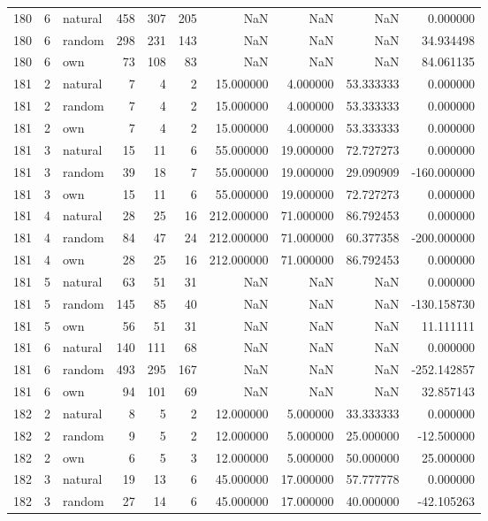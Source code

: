 \begin{table}[htbp]
\begin{tabular}{rrlrrrrrrr}
180 & 6 & natural & 458 & 307 & 205 & NaN & NaN & NaN & 0.000000 \\
180 & 6 & random & 298 & 231 & 143 & NaN & NaN & NaN & 34.934498 \\
180 & 6 & own & 73 & 108 & 83 & NaN & NaN & NaN & 84.061135 \\
181 & 2 & natural & 7 & 4 & 2 & 15.000000 & 4.000000 & 53.333333 & 0.000000 \\
181 & 2 & random & 7 & 4 & 2 & 15.000000 & 4.000000 & 53.333333 & 0.000000 \\
181 & 2 & own & 7 & 4 & 2 & 15.000000 & 4.000000 & 53.333333 & 0.000000 \\
181 & 3 & natural & 15 & 11 & 6 & 55.000000 & 19.000000 & 72.727273 & 0.000000 \\
181 & 3 & random & 39 & 18 & 7 & 55.000000 & 19.000000 & 29.090909 & -160.000000 \\
181 & 3 & own & 15 & 11 & 6 & 55.000000 & 19.000000 & 72.727273 & 0.000000 \\
181 & 4 & natural & 28 & 25 & 16 & 212.000000 & 71.000000 & 86.792453 & 0.000000 \\
181 & 4 & random & 84 & 47 & 24 & 212.000000 & 71.000000 & 60.377358 & -200.000000 \\
181 & 4 & own & 28 & 25 & 16 & 212.000000 & 71.000000 & 86.792453 & 0.000000 \\
181 & 5 & natural & 63 & 51 & 31 & NaN & NaN & NaN & 0.000000 \\
181 & 5 & random & 145 & 85 & 40 & NaN & NaN & NaN & -130.158730 \\
181 & 5 & own & 56 & 51 & 31 & NaN & NaN & NaN & 11.111111 \\
181 & 6 & natural & 140 & 111 & 68 & NaN & NaN & NaN & 0.000000 \\
181 & 6 & random & 493 & 295 & 167 & NaN & NaN & NaN & -252.142857 \\
181 & 6 & own & 94 & 101 & 69 & NaN & NaN & NaN & 32.857143 \\
182 & 2 & natural & 8 & 5 & 2 & 12.000000 & 5.000000 & 33.333333 & 0.000000 \\
182 & 2 & random & 9 & 5 & 2 & 12.000000 & 5.000000 & 25.000000 & -12.500000 \\
182 & 2 & own & 6 & 5 & 3 & 12.000000 & 5.000000 & 50.000000 & 25.000000 \\
182 & 3 & natural & 19 & 13 & 6 & 45.000000 & 17.000000 & 57.777778 & 0.000000 \\
182 & 3 & random & 27 & 14 & 6 & 45.000000 & 17.000000 & 40.000000 & -42.105263 \\

\end{tabular}
\end{table}

